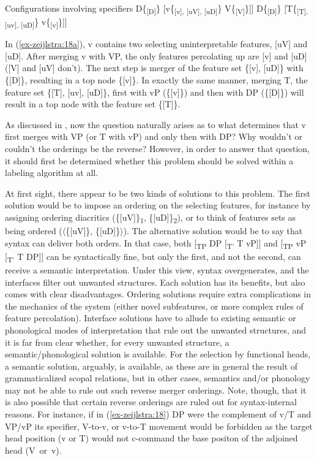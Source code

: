 \documentclass[output=paper
,modfonts
,nonflat]{langsci/langscibook}
\begin{document}
\begin{exe}
	\ex Configurations involving specifiers \label{ex-zeijlstra:18}
		\xlist
		\ex {[}D\{\textsubscript{{[}D{]}}\} \label{ex-zeijlstra:18a} {[}v\{\textsubscript{{[}v{]}, {[}uV{]}, {[}uD{]}}\} V\{\textsubscript{{[}V{]}}\}{]}{]}
		\ex {[}D\{\textsubscript{{[}D{]}}\} {[}T\{\textsubscript{{[}T{]}, {[}uv{]}, {[}uD{]}}\} v\{\textsubscript{{[}v{]}}\}{]}{]}
		\endxlist
	\end{exe}
In (\ref{ex-zeijlstra:18a}), v contains two selecting uninterpretable features, [uV] and [uD]. After merging v with VP, the only features percolating up are [v] and [uD] ([V] and [uV] don’t). The next step is merger of the feature set \{[v], [uD]\} with \{[D]\}, resulting in a top node \{[v]\}. In exactly the same manner, merging T, the feature set \{[T], [uv], [uD]\}, first with vP (\{[v]\}) and then with DP (\{[D]\}) will result in a top node with the feature set \{[T]\}.

As discussed in , now the question naturally arises as to what determines that v first merges with VP (or T with vP) and only then with DP? Why wouldn’t or couldn’t the orderings be the reverse? However, in order to answer that question, it should first be determined whether this problem should be solved within a labeling algorithm at all.

At first sight, there appear to be two kinds of solutions to this problem. The first solution would be to impose an ordering on the selecting features, for instance by assigning ordering diacritics (\{[uV]\}\textsubscript{1}, \{[uD]\}\textsubscript{2}), or to think of features sets as being ordered ($\langle$\{[uV]\}, \{[uD]\}$\rangle$). The alternative solution would be to say that syntax can deliver both orders. In that case, both [\textsubscript{TP} DP [\textsubscript{T’} T vP]] and [\textsubscript{TP} vP [\textsubscript{T’} T DP]] can be syntactically fine, but only the first, and not the second, can receive a semantic interpretation. Under this view, syntax overgenerates, and the interfaces filter out unwanted structures. Each solution has its benefits, but also comes with clear disadvantages. Ordering solutions require extra complications in the mechanics of the system (either novel subfeatures, or more complex rules of feature percolation). Interface solutions have to allude to existing semantic or phonological modes of interpretation that rule out the unwanted structures, and it is far from clear whether, for every unwanted structure, a semantic\slash phonological solution is available. For the selection by functional heads, a semantic solution, arguably, is available, as these are in general the result of grammaticalized scopal relations, but in other cases, semantics and\slash or phonology may not be able to rule out such reverse merger orderings. Note, though, that it is also possible that certain reverse orderings are ruled out for syntax-internal reasons. For instance, if in (\ref{ex-zeijlstra:18}) DP were the complement of v/T and VP/vP its specifier, V-to-v, or v-to-T movement would be forbidden as the target head position (v or T) would not c-command the base positon of the adjoined head \mbox{(V or v).}
\end{document}

